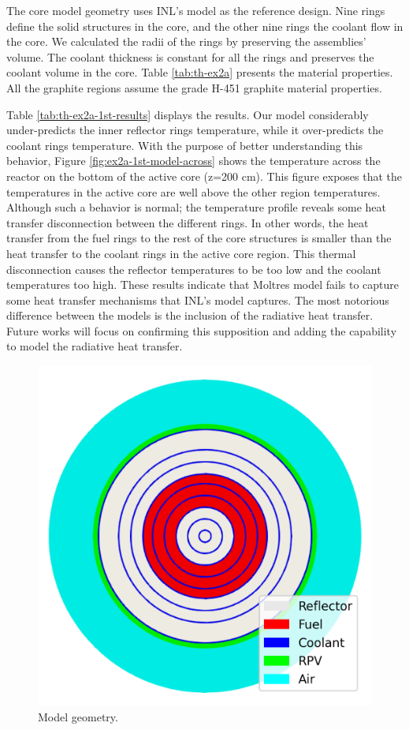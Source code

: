The core model geometry uses INL's model as the reference design.
Nine rings define the solid structures in the core, and the other nine rings the coolant flow in the core.
We calculated the radii of the rings by preserving the assemblies' volume.
The coolant thickness is constant for all the rings and preserves the coolant volume in the core.
Table \ref{tab:th-ex2a} presents the material properties.
All the graphite regions assume the grade H-451 graphite material properties.

Table \ref{tab:th-ex2a-1st-results} displays the results.
Our model considerably under-predicts the inner reflector rings temperature, while it over-predicts the coolant rings temperature.
With the purpose of better understanding this behavior, Figure \ref{fig:ex2a-1st-model-across} shows the temperature across the reactor on the bottom of the active core (z=200 cm).
This figure exposes that the temperatures in the active core are well above the other region temperatures.
Although such a behavior is normal; the temperature profile reveals some heat transfer disconnection between the different rings.
In other words, the heat transfer from the fuel rings to the rest of the core structures is smaller than the heat transfer to the coolant rings in the active core region.
This thermal disconnection causes the reflector temperatures to be too low and the coolant temperatures too high.
These results indicate that Moltres model fails to capture some heat transfer mechanisms that INL's model captures.
The most notorious difference between the models is the inclusion of the radiative heat transfer.
Future works will focus on confirming this supposition and adding the capability to model the radiative heat transfer.

\begin{figure}[htbp!]
  \centering
  \includegraphics[width=0.45\linewidth]{figures-thermal/ex2a-meshD2}
  \hfill
  \caption{Model geometry.}
  \label{fig:ex2a-1st-model}
\end{figure}

